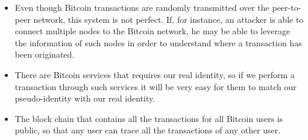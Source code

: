 \begin{itemize}
\item Even though Bitcoin transactions are randomly transmitted over the peer-to-peer network, this system is not perfect. If, for instance, an attacker is able to connect multiple nodes to the Bitcoin network, he may be able to leverage the information of such nodes in order to understand where a transaction has been originated.
\item There are Bitcoin services that requires our real identity, so if we perform a transaction through such services it will be very easy for them to match our pseudo-identity with our real identity.
\item The block chain that contains all the transactions for all Bitcoin users is public, so that any user can trace all the transactions of any other user.
\end{itemize}
